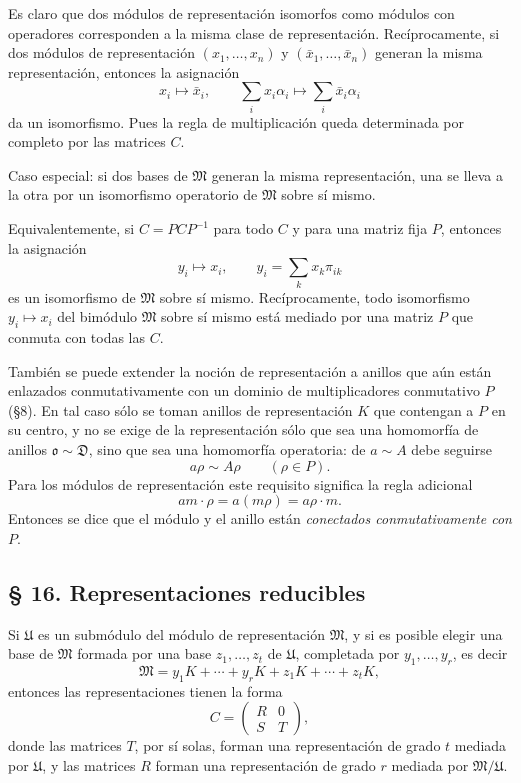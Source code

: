 \documentclass[11pt]{article}
\providecommand{\mM}{\mathfrak{M}}
\providecommand{\mU}{\mathfrak{U}}
\providecommand{\mo}{\mathfrak{o}}
\begin{document}
Es claro que dos módulos de representación isomorfos como módulos con operadores corresponden a la misma clase de representación. Recíprocamente, si dos módulos de representación $(x_1,\ldots,x_n)$ y $(\bar x_1,\ldots,\bar x_n)$ generan la misma representación, entonces la asignación
\[
        x_i\mapsto \bar x_i,
        \qquad
        \sum_i x_i\alpha_i\mapsto \sum_i \bar x_i\alpha_i
\]
da un isomorfismo. Pues la regla de multiplicación queda determinada por completo por las matrices $C$.

Caso especial: si dos bases de $\mM$ generan la misma representación, una se lleva a la otra por un isomorfismo operatorio de $\mM$ sobre sí mismo.

Equivalentemente, si $C=PCP^{-1}$ para todo $C$ y para una matriz fija $P$, entonces la asignación
\[
        y_i\mapsto x_i,
        \qquad
        y_i=\sum_k x_k\pi_{ik}
\]
es un isomorfismo de $\mM$ sobre sí mismo. Recíprocamente, todo isomorfismo $y_i\mapsto x_i$ del bimódulo $\mM$ sobre sí mismo está mediado por una matriz $P$ que conmuta con todas las $C$.

También se puede extender la noción de representación a anillos que aún están enlazados conmutativamente con un dominio de multiplicadores conmutativo $P$ (§8). En tal caso sólo se toman anillos de representación $K$ que contengan a $P$ en su centro, y no se exige de la representación sólo que sea una homomorfía de anillos $\mo\sim\mathfrak D$, sino que sea una homomorfía operatoria: de $a\sim A$ debe seguirse
\[
        a\rho\sim A\rho\qquad(\rho\in P).
\]
Para los módulos de representación este requisito significa la regla adicional
\[
        am\cdot\rho=a(m\rho)=a\rho\cdot m.
\]
Entonces se dice que el módulo y el anillo están \emph{conectados conmutativamente con $P$}.

\subsection*{§ 16. Representaciones reducibles}

Si $\mU$ es un submódulo del módulo de representación $\mM$, y si es posible elegir una base de $\mM$ formada por una base $z_1,\ldots,z_t$ de $\mU$, completada por $y_1,\ldots,y_r$, es decir
\[
        \mM=y_1K+\cdots+y_rK+z_1K+\cdots+z_tK,        \tag{2a}
\]
entonces las representaciones tienen la forma
\[
        C=\begin{pmatrix}R&0\\ S&T\end{pmatrix},
\]
donde las matrices $T$, por sí solas, forman una representación de grado $t$ mediada por $\mU$, y las matrices $R$ forman una representación de grado $r$ mediada por $\mM/\mU$.
\end{document}
